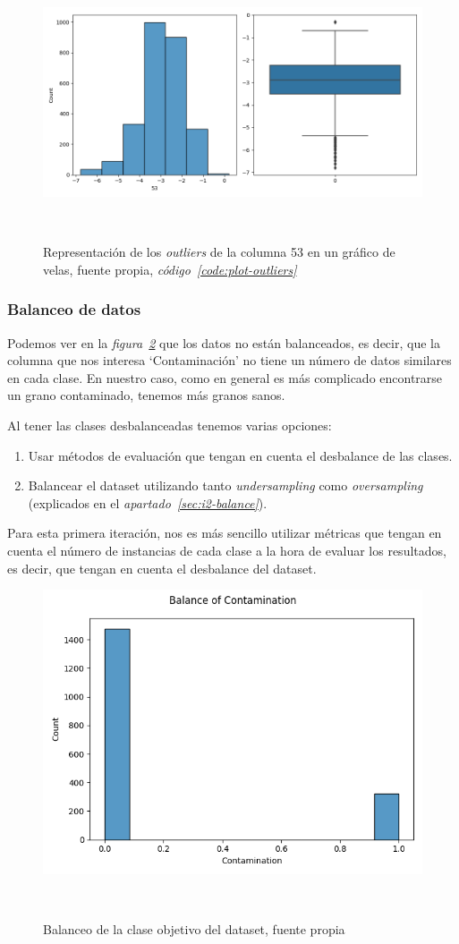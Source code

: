 \begin{figure}[!htb]
    \centering
    \includegraphics[width=0.7\linewidth]{media/images/col-53-outliers.png}
    \caption{Representación de los \textit{outliers} de la columna 53 en un gráfico de velas, fuente propia, \textit{código\ \ref{code:plot-outliers}}}\ \label{fig:outliers}
\end{figure}


\subsubsection{Balanceo de datos}

Podemos ver en la \textit{figura\ \ref{fig:unbalance}} que los datos no están balanceados, es decir, que la columna que nos interesa `Contaminación' no tiene un número de datos similares en cada clase. En nuestro caso, como en general es más complicado encontrarse un grano contaminado, tenemos más granos sanos.

Al tener las clases desbalanceadas tenemos varias opciones:
\begin{enumerate}
    \item Usar métodos de evaluación que tengan en cuenta el desbalance de las clases.
    \item Balancear el \gls{dataset} utilizando tanto \textit{undersampling} como \textit{oversampling} (explicados en el \textit{apartado\ \ref{sec:i2-balance}}).
\end{enumerate}

Para esta primera iteración, nos es más sencillo utilizar métricas que tengan en cuenta el número de instancias de cada clase a la hora de evaluar los resultados, es decir, que tengan en cuenta el desbalance del \gls{dataset}.

\begin{figure}[!ht]
    \centering
    \includegraphics[width=0.7\linewidth]{media/images/unabalance.png}
    \caption{Balanceo de la clase objetivo del \gls{dataset}, fuente propia}\ \label{fig:unbalance}
\end{figure}


